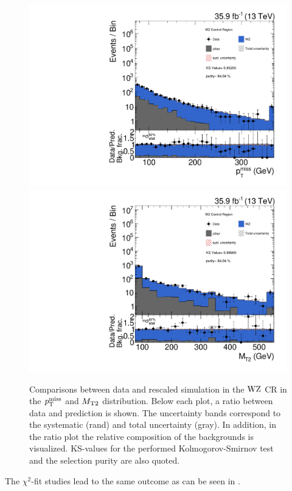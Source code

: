 \begin{figure}[tbp]
 \centering
 \includegraphics[width=\pairwidth]{figures/plots_CR_wz/CRWZ_LL_nom_met_log}
 \includegraphics[width=\pairwidth]{figures/plots_CR_wz/CRWZ_LL_nom_mt2_log}
 \caption{Comparisons between data and rescaled simulation in the $\mathrm{W}\mathrm{Z}$ CR in the $p_{\mathrm{T}}^\text{miss}$ and $M_{\mathrm{T2}}$ distribution. Below each plot, a ratio between data and prediction is shown. The uncertainty bands correspond to the systematic (rand) and total uncertainty (gray). In addition, in the ratio plot the relative composition of the backgrounds is visualized. KS-values for the performed Kolmogorov-Smirnov test and the selection purity are also quoted.}
 \label{fig:CRWZ}
\end{figure}
The $\chi^2$-fit studies lead to the same outcome as can be seen in .

